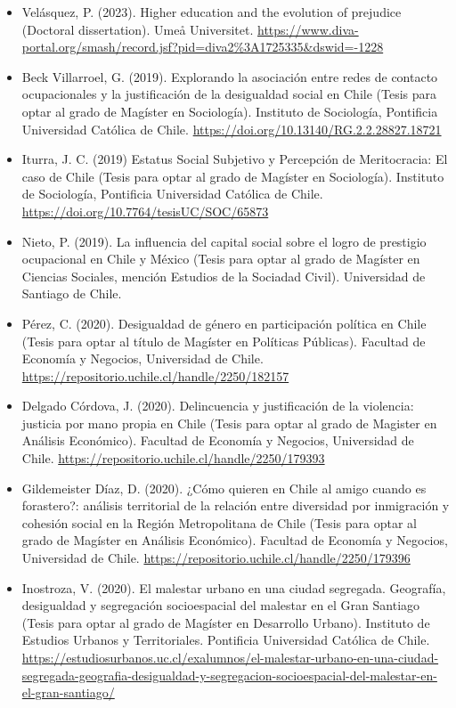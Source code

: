 \documentclass[
  12pt,
]{article}
\providecommand{\tightlist}{%
  \setlength{\itemsep}{0pt}\setlength{\parskip}{0pt}}
\begin{document}
\begin{itemize}
\tightlist
\item
  Velásquez, P. (2023). Higher education and the evolution of prejudice (Doctoral dissertation). Umeå Universitet. \url{https://www.diva-portal.org/smash/record.jsf?pid=diva2\%3A1725335\&dswid=-1228}
\item
  Beck Villarroel, G. (2019). Explorando la asociación entre redes de contacto ocupacionales y la justificación de la desigualdad social en Chile (Tesis para optar al grado de Magíster en Sociología). Instituto de Sociología, Pontificia Universidad Católica de Chile. \url{https://doi.org/10.13140/RG.2.2.28827.18721}
\item
  Iturra, J. C. (2019) Estatus Social Subjetivo y Percepción de Meritocracia: El caso de Chile (Tesis para optar al grado de Magíster en Sociología). Instituto de Sociología, Pontificia Universidad Católica de Chile. \url{https://doi.org/10.7764/tesisUC/SOC/65873}
\item
  Nieto, P. (2019). La influencia del capital social sobre el logro de prestigio ocupacional en Chile y México (Tesis para optar al grado de Magíster en Ciencias Sociales, mención Estudios de la Sociadad Civil). Universidad de Santiago de Chile.
\item
  Pérez, C. (2020). Desigualdad de género en participación política en Chile (Tesis para optar al título de Magíster en Políticas Públicas). Facultad de Economía y Negocios, Universidad de Chile. \url{https://repositorio.uchile.cl/handle/2250/182157}
\item
  Delgado Córdova, J. (2020). Delincuencia y justificación de la violencia: justicia por mano propia en Chile (Tesis para optar al grado de Magister en Análisis Económico). Facultad de Economía y Negocios, Universidad de Chile. \url{https://repositorio.uchile.cl/handle/2250/179393}
\item
  Gildemeister Díaz, D. (2020). ¿Cómo quieren en Chile al amigo cuando es forastero?: análisis territorial de la relación entre diversidad por inmigración y cohesión social en la Región Metropolitana de Chile (Tesis para optar al grado de Magíster en Análisis Económico). Facultad de Economía y Negocios, Universidad de Chile. \url{https://repositorio.uchile.cl/handle/2250/179396}
\item
  Inostroza, V. (2020). El malestar urbano en una ciudad segregada. Geografía, desigualdad y segregación socioespacial del malestar en el Gran Santiago (Tesis para optar al grado de Magíster en Desarrollo Urbano). Instituto de Estudios Urbanos y Territoriales. Pontificia Universidad Católica de Chile. \url{https://estudiosurbanos.uc.cl/exalumnos/el-malestar-urbano-en-una-ciudad-segregada-geografia-desigualdad-y-segregacion-socioespacial-del-malestar-en-el-gran-santiago/}

\end{itemize}
\end{document}
